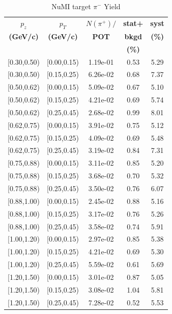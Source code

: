 \documentclass[%
aps, prd, reprint, show pacs, preprint numbers, ams math, amssymb, superscriptaddress, linenumbers]{revtex4-1}
\begin{document}
\begin{table}
\caption{NuMI target $\pi^-$ Yield}
\begin{tabular}{|c|c|c|c|c|}
\hline

\textbf{$p_z$} & \textbf{$p_T$} & \textbf{$N(\pi^+)/$} & \textbf{stat+} & \textbf{syst}\\
\textbf{(GeV/c)} &\textbf{(GeV/c)} & \textbf{POT}& \textbf{bkgd}& \textbf{(\%)}\\
& & & \textbf{(\%)} & \\

\hline

[0.30,0.50) & [0.00,0.15) & 1.19e-01 & 0.53 & 5.29 \\ 
 \hline
[0.30,0.50) & [0.15,0.25) & 6.26e-02 & 0.68 & 7.37 \\ 
 \hline
[0.50,0.62) & [0.00,0.15) & 5.09e-02 & 0.67 & 5.10 \\ 
 \hline
[0.50,0.62) & [0.15,0.25) & 4.21e-02 & 0.69 & 5.74 \\ 
 \hline
[0.50,0.62) & [0.25,0.45) & 2.68e-02 & 0.99 & 8.01 \\ 
 \hline
[0.62,0.75) & [0.00,0.15) & 3.91e-02 & 0.75 & 5.12 \\ 
 \hline
[0.62,0.75) & [0.15,0.25) & 4.09e-02 & 0.69 & 5.48 \\ 
 \hline
[0.62,0.75) & [0.25,0.45) & 3.19e-02 & 0.84 & 7.31 \\ 
 \hline
[0.75,0.88) & [0.00,0.15) & 3.11e-02 & 0.85 & 5.20 \\ 
 \hline
[0.75,0.88) & [0.15,0.25) & 3.68e-02 & 0.70 & 5.32 \\ 
 \hline
[0.75,0.88) & [0.25,0.45) & 3.50e-02 & 0.76 & 6.07 \\ 
 \hline
[0.88,1.00) & [0.00,0.15) & 2.45e-02 & 0.88 & 5.16 \\ 
 \hline
[0.88,1.00) & [0.15,0.25) & 3.17e-02 & 0.76 & 5.26 \\ 
 \hline
[0.88,1.00) & [0.25,0.45) & 3.58e-02 & 0.74 & 5.91 \\ 
 \hline
[1.00,1.20) & [0.00,0.15) & 2.97e-02 & 0.85 & 5.38 \\ 
 \hline
[1.00,1.20) & [0.15,0.25) & 4.21e-02 & 0.69 & 5.30 \\ 
 \hline
[1.00,1.20) & [0.25,0.45) & 5.59e-02 & 0.61 & 5.69 \\ 
 \hline
[1.20,1.50) & [0.00,0.15) & 3.01e-02 & 0.87 & 5.05 \\ 
 \hline
[1.20,1.50) & [0.15,0.25) & 3.08e-02 & 1.04 & 5.81 \\ 
 \hline
[1.20,1.50) & [0.25,0.45) & 7.28e-02 & 0.52 & 5.53 \\ 

\end{tabular}
\end{table}
\end{document}
